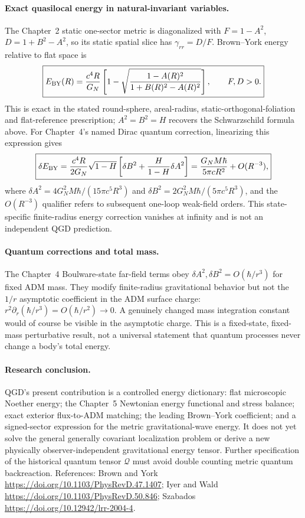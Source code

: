 \documentclass[11pt,a4paper]{article}
\theoremstyle{definition}\newtheorem{definition}[theorem]{Definition}
\theoremstyle{remark}\newtheorem{remark}[theorem]{Remark}
\begin{document}
\paragraph{Exact quasilocal energy in natural-invariant variables.}
The Chapter~2 static one-sector metric is diagonalized with
$F=1-A^2$, $D=1+B^2-A^2$, so its static spatial slice has
$\gamma_{rr}=D/F$. Brown--York energy relative to flat space is
\begin{equation}\label{eq:v14-byAB}
\boxed{E_{\rm BY}(R)=\frac{c^4R}{G_N}\left[
1-\sqrt{\frac{1-A(R)^2}{1+B(R)^2-A(R)^2}}
\right],\qquad F,D>0.}
\end{equation}
This is exact in the stated round-sphere, areal-radius,
static-orthogonal-foliation and flat-reference prescription;
$A^2=B^2=H$ recovers the Schwarzschild formula above.
For Chapter~4's named Dirac quantum correction, linearizing this
expression gives
\begin{equation}\label{eq:v14-byquantum}
\boxed{\delta E_{\rm BY}=\frac{c^4R}{2G_N}\sqrt{1-H}
\left[\delta B^2+\frac{H}{1-H}\delta A^2\right]
=\frac{G_NM\hbar}{5\pi cR^2}+O(R^{-3}),}
\end{equation}
where $\delta A^2=4G_N^2M\hbar/(15\pi c^5R^3)$ and
$\delta B^2=2G_N^2M\hbar/(5\pi c^5R^3)$,
and the $O(R^{-3})$ qualifier refers to subsequent
one-loop weak-field orders. This state-specific finite-radius energy
correction vanishes at infinity and is not an independent QGD prediction.

\paragraph{Quantum corrections and total mass.}
The Chapter~4 Boulware-state far-field terms obey
$\delta A^2,\delta B^2=O(\hbar/r^3)$ for fixed ADM mass.
They modify finite-radius gravitational behavior but not the
$1/r$ asymptotic coefficient in the ADM surface charge:
$r^2\partial_r(\hbar/r^3)=O(\hbar/r^2)\to0$.
A genuinely changed mass integration constant would of course be
visible in the asymptotic charge. This is a fixed-state,
fixed-mass perturbative result, not a universal statement that
quantum processes never change a body's total energy.

\paragraph{Research conclusion.}
QGD's present contribution is a controlled energy dictionary:
flat microscopic Noether energy; the Chapter~5 Newtonian energy
functional and stress balance; exact exterior flux-to-ADM matching;
the leading Brown--York coefficient; and a signed-sector expression
for the metric gravitational-wave energy. It does not yet solve the
general generally covariant localization problem or derive a new
physically observer-independent gravitational energy tensor.
Further specification of the historical quantum tensor
$\mathcal Q$ must avoid double counting metric quantum backreaction.
References: Brown and York \url{https://doi.org/10.1103/PhysRevD.47.1407};
Iyer and Wald \url{https://doi.org/10.1103/PhysRevD.50.846};
Szabados \url{https://doi.org/10.12942/lrr-2004-4}.
\end{document}
